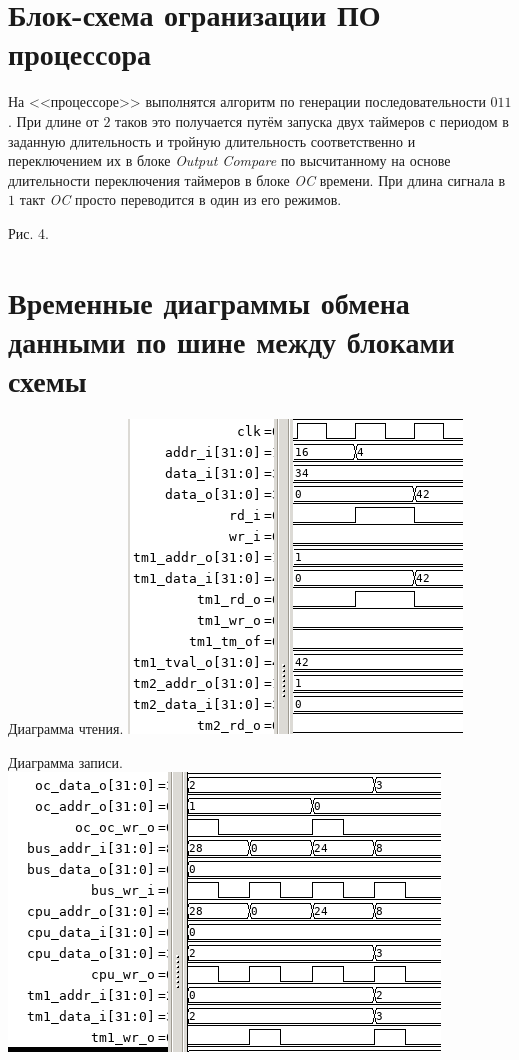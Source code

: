 \documentclass[12pt, a4paper] {ncc}
\begin{document}
\section{Блок-схема огранизации ПО процессора}

	На <<процессоре>> выполнятся алгоритм по генерации последовательности $011$.
	При длине от $2$ таков это получается путём запуска двух таймеров с периодом в заданную длительность
	и тройную длительность соответственно и переключением их в блоке {\it Output Compare}
	по высчитанному на основе длительности переключения таймеров в блоке {\it OC} времени. 
	При длина сигнала в $1$ такт {\it OC} просто переводится в один из его режимов.

	Рис. 4.

\section{Временные диаграммы обмена данными по шине между блоками схемы}
Диаграмма чтения.
\includegraphics[scale=0.7]{./diagram_read.png}

Диаграмма записи.
\includegraphics[scale=0.7]{./diagram_write.png}
\end{document}
